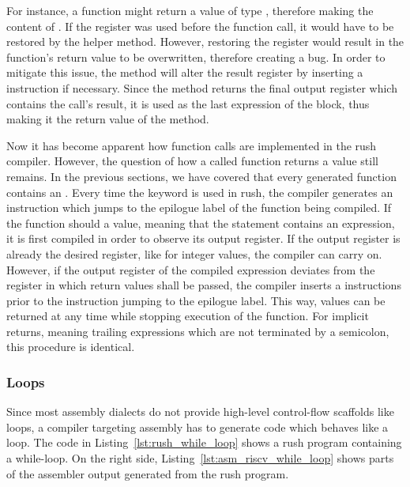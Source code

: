 For instance, a function might return a value of type , therefore making  the content of .
If the register  was used before the function call, it would have to be restored by the helper method.
However, restoring the register would result in the function's return value to be overwritten, therefore creating a bug.
In order to mitigate this issue, the method will alter the result register by inserting a  instruction if necessary.
Since the method returns the final output register which contains the call's result, it is used as the last expression of the block, thus making it the return value of the  method.

Now it has become apparent how function calls are implemented in the rush \riscv{} compiler.
However, the question of how a called function returns a value still remains.
In the previous sections, we have covered that every generated function contains an .
Every time the  keyword is used in rush, the compiler generates an instruction which jumps to the epilogue label of the function being compiled.
If the function should a value, meaning that the  statement contains an expression,
it is first compiled in order to observe its output register.
If the output register is already the desired register, like  for integer values, the compiler can carry on.
However, if the output register of the compiled expression deviates from the register in which return values shall be passed,
the compiler inserts a  instructions prior to the instruction jumping to the epilogue label.
This way, values can be returned at any time while stopping execution of the function.
For implicit returns, meaning trailing expressions which are not terminated by a semicolon,
this procedure is identical.

\subsubsection{Loops}

Since most assembly dialects do not provide high-level control-flow scaffolds like loops,
a compiler targeting assembly has to generate code which behaves like a loop.
The code in Listing~\ref{lst:rush_while_loop} shows a rush program containing a while-loop.
On the right side, Listing~\ref{lst:asm_riscv_while_loop} shows parts of the assembler output generated from the rush program.

\begin{minipage}{.32\textwidth}
	\center
\end{minipage}%
\hspace{2.5cm}
\begin{minipage}{.47\textwidth}
	\center
\end{minipage}

